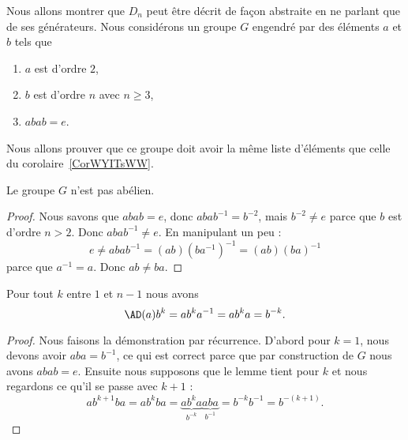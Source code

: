 \begin{normaltext}      \label{NORMooCCUEooRRENed}
	Nous allons montrer que \( D_n\) peut être décrit de façon abstraite en ne parlant que de ses générateurs. Nous considérons un groupe \( G\) engendré par des éléments \( a\) et \( b\) tels que
	\begin{enumerate}
		\item
		      \( a\) est d'ordre \( 2\),
		\item
		      \( b\) est d'ordre \( n\) avec \( n\geq 3\),
		\item
		      \( abab=e\).
	\end{enumerate}
	Nous allons prouver que ce groupe doit avoir la même liste d'éléments que celle du corolaire~\ref{CorWYITsWW}.
\end{normaltext}

\begin{proposition}
	Le groupe \( G\) n'est pas abélien.
\end{proposition}

\begin{proof}
	Nous savons que \( abab=e\), donc \( abab^{-1}=b^{-2}\), mais \( b^{-2}\neq e\) parce que \( b\) est d'ordre \( n>2\). Donc \( abab^{-1}\neq e\). En manipulant un peu :
	\begin{equation}
		e\neq abab^{-1}=(ab)(ba^{-1})^{-1}=(ab)(ba)^{-1}
	\end{equation}
	parce que \( a^{-1}=a\). Donc \( ab\neq ba\).
\end{proof}

\begin{lemma}        \label{LemKKXdqdL}
	Pour tout \( k\) entre \( 1\) et \( n-1\) nous avons
	\begin{equation}
		\AD(a)b^k=ab^ka^{-1}=ab^ka=b^{-k}.
	\end{equation}
\end{lemma}

\begin{proof}
	Nous faisons la démonstration par récurrence. D'abord pour \( k=1\), nous devons avoir \( aba=b^{-1}\), ce qui est correct parce que par construction de \( G\) nous avons \( abab=e\). Ensuite nous supposons que le lemme tient pour \( k\) et nous regardons ce qu'il se passe avec \( k+1\) :
	\begin{equation}
		ab^{k+1}ba=ab^kba=\underbrace{ab^ka}_{b^{-k}}\underbrace{aba}_{b^{-1}}=b^{-k}b^{-1}=b^{-(k+1)}.
	\end{equation}
\end{proof}


